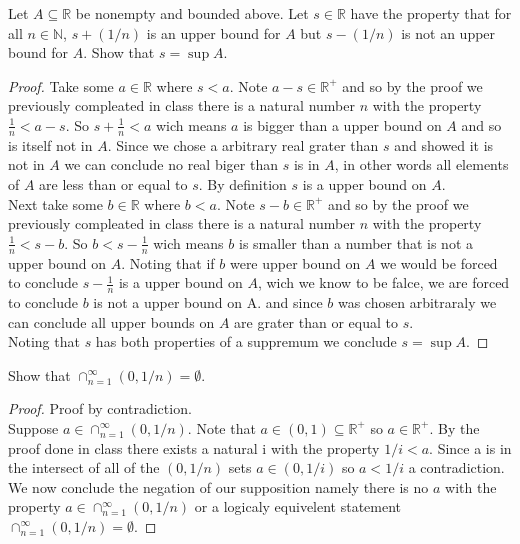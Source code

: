 \documentclass[12pt]{article}
\makeatletter
\theoremstyle{homework}
\newenvironment{exercise}[1]
{\def\@currentlabel{#1}\exercisecore}
{\endexercisecore}
\newcommand{\Reals}{\ensuremath{\mathbb R}}
\newcommand{\Nats}{\ensuremath{\mathbb N}}
\makeatother
\begin{document}
\begin{exercise}{1.4.2}
Let $A\subseteq \Reals$ be nonempty and bounded above. Let $s\in\Reals$ have
the property that for all $n\in\Nats$, $s+(1/n)$ is an upper bound for $A$
but $s-(1/n)$ is not an upper bound for $A$.  Show that $s=\sup A$.
\end{exercise}
\begin{proof}
Take some $a\in\mathbb{R}$ where $s<a$.  Note $a-s\in \mathbb{R}^+$ and so by the proof we previously compleated in class there is a natural number $n$ with the property $\frac{1}{n}<a-s$.  So $s+\frac{1}{n}<a$ wich means $a$ is bigger than a upper bound on $A$ and so is itself not in $A$.  Since we chose a arbitrary real grater than $s$ and showed it is not in $A$ we can conclude no real biger than $s$ is in $A$, in other words all elements of $A$ are less than or equal to $s$.  By definition $s$ is a upper bound on $A$.\\
Next take some $b\in\mathbb{R}$ where $b<a$.  Note $s-b\in \mathbb{R}^+$ and so by the proof we previously compleated in class there is a natural number $n$ with the property $\frac{1}{n}<s-b$.  So $b<s-\frac{1}{n}$ wich means $b$ is smaller than a number that is not a upper bound on $A$.  Noting that if $b$ were upper bound on $A$ we would be forced to conclude $s-\frac{1}{n}$ is a upper bound on $A$, wich we know to be falce, we are forced to conclude $b$ is not a upper bound on A.  and since $b$ was chosen arbitraraly we can conclude all upper bounds on $A$ are grater than or equal to $s$.\\
Noting that $s$ has both properties of a suppremum we conclude $s=\sup A$.
\end{proof}

\begin{exercise}{1.4.3} Show that $\cap_{n=1}^\infty (0,1/n)=\emptyset$.
\end{exercise}
\begin{proof}
Proof by contradiction.\\
Suppose $a\in \cap_{n=1}^\infty (0,1/n)$.  Note that $a\in (0,1) \subseteq \mathbb{R}^+$ so $a\in\mathbb{R}^+$.  By the proof done in class there exists a natural i with the property $1/i<a$.  Since a is in the intersect of all of the $(0,1/n)$ sets $a\in (0,1/i)$ so $a<1/i$ a contradiction.  We now conclude the negation of our supposition namely there is no $a$ with the property $a\in \cap_{n=1}^\infty (0,1/n)$ or a logicaly equivelent statement $\cap_{n=1}^\infty (0,1/n)=\emptyset$.
\end{proof}
\end{document}
